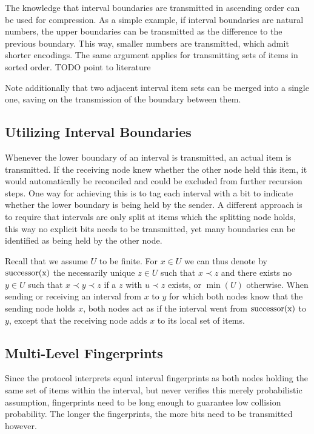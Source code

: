 The knowledge that interval boundaries are transmitted in ascending order can be used for compression. As a simple example, if interval boundaries are natural numbers, the upper boundaries can be transmitted as the difference to the previous boundary. This way, smaller numbers are transmitted, which admit shorter encodings. The same argument applies for transmitting sets of items in sorted order. TODO point to literature

Note additionally that two adjacent interval item sets can be merged into a single one, saving on the transmission of the boundary between them.

\subsection{Utilizing Interval Boundaries}

Whenever the lower boundary of an interval is transmitted, an actual item is transmitted. If the receiving node knew whether the other node held this item, it would automatically be reconciled and could be excluded from further recursion steps. One way for achieving this is to tag each interval with a bit to indicate whether the lower boundary is being held by the sender. A different approach is to require that intervals are only split at items which the splitting node holds, this way no explicit bits needs to be transmitted, yet many boundaries can be identified as being held by the other node.

Recall that we assume $U$ to be finite. For $x \in U$ we can thus denote by $\operatorname{successor({x})}$ the necessarily unique $z \in U$ such that $x \prec z$ and there exists no $y \in U$ such that $x \prec y \prec z$ if a $z$ with $u \prec z$ exists, or $\min(U)$ otherwise. When sending or receiving an interval from $x$ to $y$ for which both nodes know that the sending node holds $x$, both nodes act as if the interval went from $\operatorname{successor({x})}$ to $y$, except that the receiving node adds $x$ to its local set of items.

\subsection{Multi-Level Fingerprints}

Since the protocol interprets equal interval fingerprints as both nodes holding the same set of items within the interval, but never verifies this merely probabilistic assumption, fingerprints need to be long enough to guarantee low collision probability. The longer the fingerprints, the more bits need to be transmitted however.

